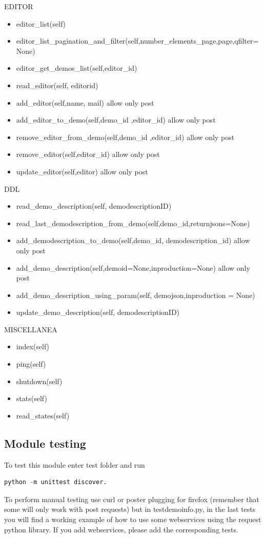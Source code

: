 EDITOR

\begin{itemize}
\item  editor\_list(self)
\item  editor\_list\_pagination\_and\_filter(self,number\_elements\_page,page,qfilter=None)
\item  editor\_get\_demos\_list(self,editor\_id)
\item  read\_editor(self, editorid)
\item  add\_editor(self,name, mail)
allow only post
\item  add\_editor\_to\_demo(self,demo\_id ,editor\_id)
allow only post
\item  remove\_editor\_from\_demo(self,demo\_id ,editor\_id)
allow only post
\item  remove\_editor(self,editor\_id)
allow only post
\item  update\_editor(self,editor)
allow only post
\end{itemize}

DDL

\begin{itemize}
\item  read\_demo\_description(self, demodescriptionID)
\item  read\_last\_demodescription\_from\_demo(self,demo\_id,returnjsons=None)
\item  add\_demodescription\_to\_demo(self,demo\_id, demodescription\_id)
allow only post
\item  add\_demo\_description(self,demoid=None,inproduction=None)
allow only post
\item  add\_demo\_description\_using\_param(self, demojson,inproduction = None)
\item  update\_demo\_description(self, demodescriptionID)
\end{itemize}

MISCELLANEA

\begin{itemize}
\item  index(self)
\item  ping(self)
\item  shutdown(self)
\item  stats(self)
\item  read\_states(self)
\end{itemize}


\subsection{Module testing}
To test this module enter test folder and run 
\begin{lstlisting}[language=Python,firstnumber=1]
python -m unittest discover.
\end{lstlisting}

To perform manual testing use curl or poster plugging for firefox (remember that some will only work with post requests) but in testdemoinfo.py, in the last tests you will find a working example of how to use some webservices using the request python library.
If you add webservices, please add the corresponding tests.
